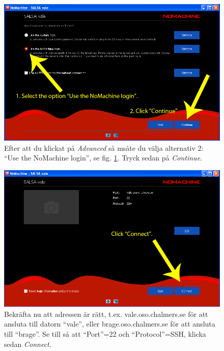 \begin{figure}[H]
    \centering
    \includegraphics[height=0.25\paperheight]{../figures/nomachinefigs/fig3_advanced.png}
    \caption{Efter att du klickat på \emph{Advanced} så msåte du välja alternativ 2: 
``Use the NoMachine login'', se fig. \ref{fig:advanced}. Tryck sedan på \emph{Continue}.}
    \label{fig:advanced}
\end{figure}
\begin{figure}[H]
    \centering
    \includegraphics[height=0.25\paperheight]{../figures/nomachinefigs/fig4_connect.png}
    \caption{Bekräfta nu att adressen är rätt, t.ex. vale.oso.chalmers.se för att 
ansluta till datorn ``vale'', eller brage.oso.chalmers.se för att ansluta till ``brage''. Se till så att ``Port''=22 och ``Protocol''=SSH, klicka sedan \emph{Connect}.}
    \label{fig:connect}
\end{figure}

